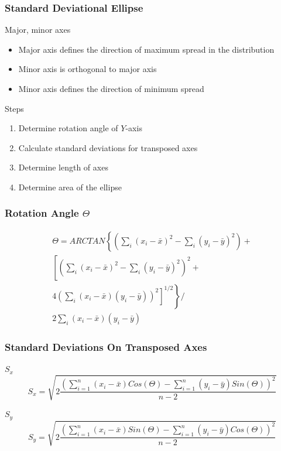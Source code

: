 \documentclass[nototal]{beamer}
\begin{document}
 \begin{frame}
   \frametitle{Standard Deviational Ellipse}
   \begin{block}{Major, minor axes}
     \begin{itemize}
       \item Major axis defines the direction of maximum spread in the
	 distribution
       \item Minor axis is orthogonal to major axis
       \item Minor axis defines the direction of minimum spread
     \end{itemize}
    \end{block}
    \begin{block}{Steps}
      \begin{enumerate}
	\item Determine rotation angle of $Y$-axis
	\item Calculate standard deviations for transposed axes
	\item Determine length of axes
	\item Determine area of the ellipse
      \end{enumerate}
     \end{block}
 \end{frame}
\begin{frame}
   \frametitle{Rotation Angle $\Theta$}
   \begin{block}{}
     \begin{eqnarray*}
       \Theta = ARCTAN \left\{ \left( \sum_{i} (x_i-\bar{x})^2  -\sum_{i} (y_i-\bar{y})^2  \right) + \right. \\
     \left[ \left( \sum_{i} (x_i-\bar{x})^2  -\sum_{i} (y_i-\bar{y})^2 \right)^2  + \right. \\
  	\left .\left.  4\left(  \sum_{i} (x_i-\bar{x}) (y_i-\bar{y})\right)^2
	\right]^{1/2} \right\} / \\
 2\sum_{i} (x_i-\bar{x}) (y_i-\bar{y})
  \end{eqnarray*}
    \end{block}
 \end{frame}

 \begin{frame}
   \frametitle{Standard Deviations On Transposed Axes}
   \begin{block}{$S_x$}
     \begin{equation}
       S_x = \sqrt{ 2\frac{(\sum_{i=1}^n (x_i-\bar{x})Cos(\Theta) -
       \sum_{i=1}^n (y_i-\bar{y})Sin(\Theta))^2}{n-2}}
     \end{equation}
    \end{block}
\begin{block}{$S_y$}
     \begin{equation}
       S_y = \sqrt{ 2\frac{(\sum_{i=1}^n (x_i-\bar{x})Sin(\Theta) -
       \sum_{i=1}^n (y_i-\bar{y})Cos(\Theta))^2}{n-2}}
     \end{equation}
    \end{block}

  \end{frame}
\end{document}

